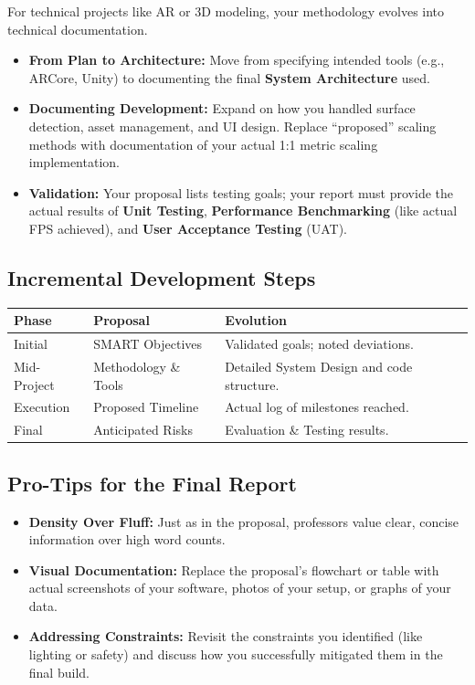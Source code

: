 \documentclass{tietreport}
\begin{document}
For technical projects like AR or 3D modeling, your
methodology evolves into technical documentation.

\begin{itemize}
\item \textbf{From Plan to Architecture:} Move from
  specifying intended tools (e.g., ARCore, Unity) to
  documenting the final \textbf{System Architecture}
  used.
\item \textbf{Documenting Development:} Expand on how
  you handled surface detection, asset management, and
  UI design. Replace ``proposed'' scaling methods with
  documentation of your actual 1:1 metric scaling
  implementation.
\item \textbf{Validation:} Your proposal lists testing
  goals; your report must provide the actual results of
  \textbf{Unit Testing}, \textbf{Performance
    Benchmarking} (like actual FPS achieved), and
  \textbf{User Acceptance Testing} (UAT).
\end{itemize}

\subsection{Incremental Development Steps}

\begin{center}
\begin{tabular}{|l|l|l|}
  \hline
  \textbf{Phase} & \textbf{Proposal} &
  \textbf{Evolution} \\
  \hline
  Initial & SMART Objectives & Validated
  goals; noted deviations. \\
  \hline
  Mid-Project & Methodology \& Tools & Detailed
  System Design and code structure. \\
  \hline
  Execution & Proposed Timeline & Actual log
  of milestones reached. \\
  \hline
  Final & Anticipated Risks & Evaluation \&
  Testing results. \\
  \hline
\end{tabular}
\end{center}

\subsection{Pro-Tips for the Final Report}

\begin{itemize}
\item \textbf{Density Over Fluff:} Just as in the
  proposal, professors value clear, concise information
  over high word counts.
\item \textbf{Visual Documentation:} Replace the
  proposal's flowchart or table with actual screenshots
  of your software, photos of your setup, or graphs of
  your data.
\item \textbf{Addressing Constraints:} Revisit the
  constraints you identified (like lighting or safety)
  and discuss how you successfully mitigated them in
  the final build.
\end{itemize}
\end{document}
